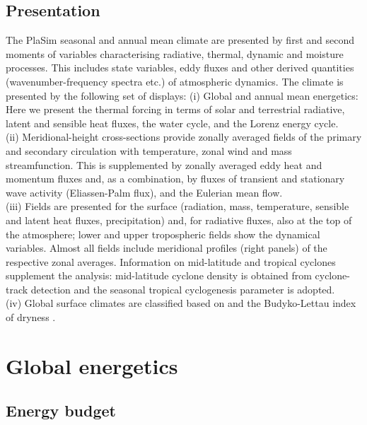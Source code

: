 \documentclass[12pt,a4paper,twoside,openright,headinclude,liststotoc,bibtotoc]{scrreprt}
\begin{document}
\vspace{-0.4cm}
\section{Presentation}
\vspace{-0.4cm}
The PlaSim seasonal and annual mean climate are presented by first and second moments of variables characterising radiative, thermal, dynamic and moisture processes. This includes state variables, eddy fluxes and other derived quantities (wavenumber-frequency spectra  etc.) of atmospheric dynamics. The climate is presented by the following set of displays:  
(i) Global and annual mean energetics: Here we present the thermal forcing in terms of solar and terrestrial radiative, latent and sensible heat fluxes, the water cycle, and the Lorenz energy cycle.\\
(ii) Meridional-height cross-sections provide zonally averaged fields of the primary and secondary circulation with temperature, zonal wind and mass streamfunction. This is supplemented by zonally averaged eddy heat and momentum fluxes and, as a combination, by fluxes of transient and stationary wave activity (Eliassen-Palm flux), and the Eulerian mean flow.\\
(iii) Fields are presented for the surface (radiation, mass, temperature, sensible and latent heat fluxes, precipitation) and, for radiative fluxes, also at the top of the atmosphere; lower and upper tropospheric fields show the dynamical variables. Almost all fields include meridional profiles (right panels) of the respective zonal averages. Information on mid-latitude and tropical cyclones supplement the analysis: mid-latitude cyclone density is obtained from cyclone-track detection and the seasonal tropical cyclogenesis parameter is adopted.\\
(iv) Global surface climates are classified based on \citet{Koeppen1936} and the Budyko-Lettau index of dryness \citep{Budyko1958,Lettau1969}.\\


\vspace{-0.4cm}
\chapter{Global energetics}
\vspace{-0.4cm}
\section{Energy budget}
\vspace{-0.4cm}
\end{document}

